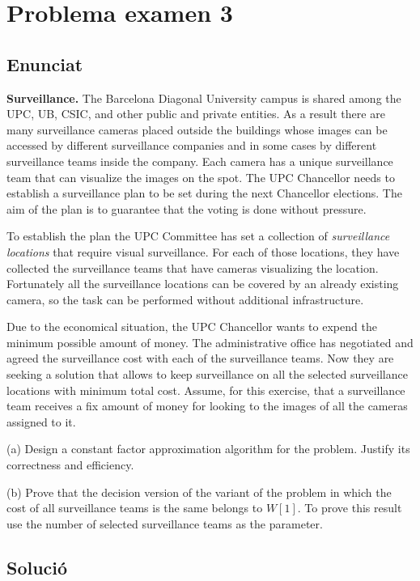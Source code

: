 \section{Problema examen 3}
\subsection{Enunciat}
\textbf{Surveillance.} The Barcelona Diagonal University campus is shared among the UPC, UB, CSIC, and other public and private entities. As a result there are many surveillance cameras placed outside the buildings whose images can be accessed by different surveillance companies and in some cases by different surveillance teams inside the company. Each camera has a unique surveillance team that can visualize the images on the spot. The UPC Chancellor needs to establish a surveillance plan to be set during the next Chancellor elections. The aim of the plan is to guarantee that the voting is done without pressure. 

To establish the plan the UPC Committee has set a collection of \textit{surveillance locations} that require visual surveillance. For each of those locations, they have collected the surveillance teams that have cameras visualizing the location. Fortunately all the surveillance locations can be covered by an already existing camera, so the task can be performed without additional infrastructure.

Due to the economical situation, the UPC Chancellor wants to expend the minimum possible amount of money. The administrative office has negotiated and agreed the surveillance cost with each of the surveillance teams. Now they are seeking a solution that allows to keep surveillance on all the selected surveillance locations with minimum total cost. Assume, for this exercise, that a surveillance team receives a fix amount of money for looking to the images of all the cameras assigned to it.

\vspace{5mm}
(a) Design a constant factor approximation algorithm for the problem. Justify its correctness and efficiency. 

\vspace{5mm}
(b) Prove that the decision version of the variant of the problem in which the cost of all surveillance teams is the same belongs to $W[1]$. To prove this result use the number of selected surveillance teams as the parameter.

\subsection{Solució}